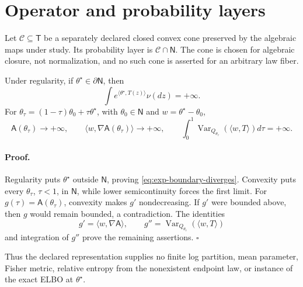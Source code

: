 \section{Operator and probability layers}
\label{sec:exp-layers}

Let \(\mathcal C\subseteq\mathsf T\) be a separately declared closed convex
cone preserved by the algebraic maps under study. Its probability layer is
\(\mathcal C\cap\mathsf N\). The cone is chosen for algebraic closure, not
normalization, and no such cone is asserted for an arbitrary law fiber.

Under regularity, if \(\theta^\star\in\partial\mathsf N\), then
\begin{equation}
\int e^{\langle\theta^\star,T(z)\rangle}\nu(dz)=+\infty.
\label{eq:exp-boundary-diverges}
\end{equation}
For \(\theta_\tau=(1-\tau)\theta_0+\tau\theta^\star\), with
\(\theta_0\in\mathsf N\) and \(w=\theta^\star-\theta_0\),
\begin{equation}
\mathsf A(\theta_\tau)\to+\infty,\qquad
\langle w,\nabla\mathsf A(\theta_\tau)\rangle\to+\infty,\qquad
\int_0^1\operatorname{Var}_{Q_{\theta_\tau}}(\langle w,T\rangle)d\tau
=+\infty.
\label{eq:exp-boundary-blowup}
\end{equation}

\paragraph{Proof.}
Regularity puts \(\theta^\star\) outside \(\mathsf N\), proving
\eqref{eq:exp-boundary-diverges}. Convexity puts every
\(\theta_\tau\), \(\tau<1\), in \(\mathsf N\), while lower
semicontinuity forces the first limit. For
\(g(\tau)=\mathsf A(\theta_\tau)\), convexity makes \(g'\)
nondecreasing. If \(g'\) were bounded above, then \(g\) would remain bounded,
a contradiction. The identities
\[
g'=\langle w,\nabla\mathsf A\rangle,\qquad
g''=\operatorname{Var}_{Q_{\theta_\tau}}(\langle w,T\rangle)
\]
and integration of \(g''\) prove the remaining assertions. \(\square\)

Thus the declared representation supplies no finite log partition, mean
parameter, Fisher metric, relative entropy from the nonexistent endpoint
law, or instance of the exact ELBO at \(\theta^\star\).

